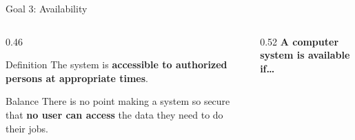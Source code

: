 \documentclass[aspectratio=169,11pt,xcolor={table}]{beamer}
\begin{document}
\begin{frame}{Goal 3: Availability}
  \begin{columns}[c]
    \begin{column}{0.46\textwidth}
      \begin{block}{Definition}
        \small The system is \textbf{accessible to authorized persons at appropriate times}.
      \end{block}
      \vspace{2mm}
      \begin{alertblock}{Balance}
        \small There is no point making a system so secure that \textbf{no user can access} the data they need to do their jobs.
      \end{alertblock}
    \end{column}
    \begin{column}{0.52\textwidth}
      \centering
      \textbf{\textcolor{grape}{A computer system is available if\dots}}\\[3mm]
    \end{column}
  \end{columns}
\end{frame}
\end{document}
